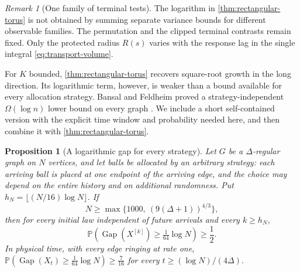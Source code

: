 \documentclass[11pt]{article}
\newtheorem{proposition}[proposition]{Proposition}
\theoremstyle{remark}
\newtheorem{remark}[remark]{Remark}
\newcommand{\Pp}{\mathbb{P}}
\newcommand{\Gap}{\operatorname{Gap}}
\begin{document}
\begin{remark}[One family of terminal tests]\label{rem:one-family}
The logarithm in \cref{thm:rectangular-torus} is not obtained by summing separate variance bounds for different observable families. The permutation and the clipped terminal contrasts remain fixed. Only the protected radius $R(s)$ varies with the response lag in the single integral \eqref{eq:transport-volume}.
\end{remark}

For $K$ bounded, \cref{thm:rectangular-torus} recovers square-root growth in the long direction. Its logarithmic term, however, is weaker than a bound available for every allocation strategy. Bansal and Feldheim proved a strategy-independent $\Omega(\log n)$ lower bound on every graph \cite{BansalFeldheim}. We include a short self-contained version with the explicit time window and probability needed here, and then combine it with \cref{thm:rectangular-torus}.

\begin{proposition}[A logarithmic gap for every strategy]\label{prop:universal-log}
Let $G$ be a $\Delta$-regular graph on $N$ vertices, and let balls be allocated by an arbitrary strategy: each arriving ball is placed at one endpoint of the arriving edge, and the choice may depend on the entire history and on additional randomness. Put $h_N=\lfloor (N/16)\log N\rfloor$. If
\[
 N\ge\max\{1000,\ (9(\Delta+1))^{4/3}\},
\]
then for every initial law independent of future arrivals and every $k\ge h_N$,
\[
 \Pp\!\left(\Gap(X^{[k]})\ge \tfrac1{64}\log N\right)\ge\frac12.
 \tag{7.8}\label{eq:universal-log}
\]
In physical time, with every edge ringing at rate one, $\Pp(\Gap(X_t)\ge\frac1{64}\log N)\ge\frac7{16}$ for every $t\ge(\log N)/(4\Delta)$.
\end{proposition}
\end{document}
